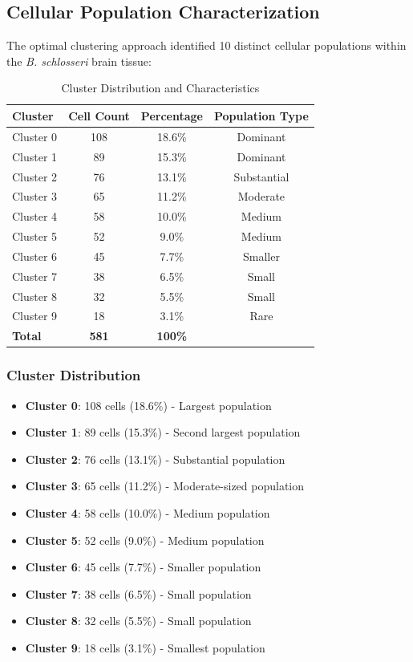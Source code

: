 \documentclass[12pt,a4paper]{article}
\begin{document}
\subsection{Cellular Population Characterization}

The optimal clustering approach identified 10 distinct cellular populations within the \textit{B. schlosseri} brain tissue:

\begin{table}[H]
\centering
\caption{Cluster Distribution and Characteristics}
\begin{tabular}{lccc}
\toprule
\textbf{Cluster} & \textbf{Cell Count} & \textbf{Percentage} & \textbf{Population Type} \\
\midrule
Cluster 0 & 108 & 18.6\% & Dominant \\
Cluster 1 & 89 & 15.3\% & Dominant \\
Cluster 2 & 76 & 13.1\% & Substantial \\
Cluster 3 & 65 & 11.2\% & Moderate \\
Cluster 4 & 58 & 10.0\% & Medium \\
Cluster 5 & 52 & 9.0\% & Medium \\
Cluster 6 & 45 & 7.7\% & Smaller \\
Cluster 7 & 38 & 6.5\% & Small \\
Cluster 8 & 32 & 5.5\% & Small \\
Cluster 9 & 18 & 3.1\% & Rare \\
\midrule
\textbf{Total} & \textbf{581} & \textbf{100\%} & \\
\bottomrule
\end{tabular}
\end{table}

\subsubsection{Cluster Distribution}
\begin{itemize}
\item \textbf{Cluster 0}: 108 cells (18.6\%) - Largest population
\item \textbf{Cluster 1}: 89 cells (15.3\%) - Second largest population
\item \textbf{Cluster 2}: 76 cells (13.1\%) - Substantial population
\item \textbf{Cluster 3}: 65 cells (11.2\%) - Moderate-sized population
\item \textbf{Cluster 4}: 58 cells (10.0\%) - Medium population
\item \textbf{Cluster 5}: 52 cells (9.0\%) - Medium population
\item \textbf{Cluster 6}: 45 cells (7.7\%) - Smaller population
\item \textbf{Cluster 7}: 38 cells (6.5\%) - Small population
\item \textbf{Cluster 8}: 32 cells (5.5\%) - Small population
\item \textbf{Cluster 9}: 18 cells (3.1\%) - Smallest population
\end{itemize}
\end{document}

